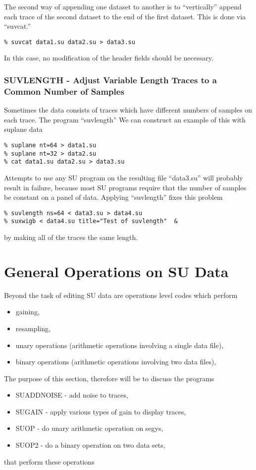 {{{{{{{The second way of appending one dataset to another is to ``vertically''
append each trace of the second dataset to the end of the first dataset.
This is done via ``suvcat.''
{\small\begin{verbatim}
% suvcat data1.su data2.su > data3.su
\end{verbatim}} \noindent
In this case, no modification of the header fields should be necessary.

\subsection{SUVLENGTH - Adjust Variable Length Traces to a Common Number of Samples}

Sometimes the data consists of traces which have different numbers
of samples on each trace. The program ``suvlength''  We can construct an example 
of this with suplane data 
{\small \begin{verbatim}
% suplane nt=64 > data1.su
% suplane nt=32 > data2.su
% cat data1.su data2.su > data3.su
\end{verbatim}} \noindent
Attempts to use any SU program on the resulting file ``data3.su''
will probably result in failure, because most SU programs require
that the number of samples be constant on a panel of data.
Applying ``suvlength'' fixes this problem
{\small \begin{verbatim}
% suvlength ns=64 < data3.su > data4.su
% suxwigb < data4.su title="Test of suvlength"  &
\end{verbatim}} \noindent
by making all of the traces the same length.

\chapter{General Operations on SU Data}
Beyond the task of editing SU data are operations level codes
which perform 
\begin{itemize}
\item gaining,
\item resampling,
\item unary operations (arithmetic operations involving a single data file),
\item binary operations (arithmetic operations involving two data files),
\end{itemize}

The purpose of this section, therefore will be to discuss the programs
\begin{itemize}
\item SUADDNOISE - add noise to traces,
\item SUGAIN - apply various types of gain to display traces,
\item SUOP - do unary arithmetic operation on segys,
\item SUOP2 - do a binary operation on two data sets,
\end{itemize}
that perform these operations

}}}}}}}
